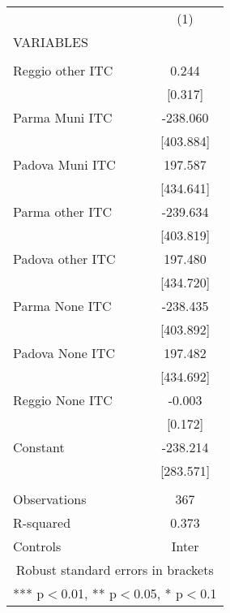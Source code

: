 \begin{tabular}{lc} \hline
 & (1) \\
VARIABLES &  \\ \hline
 &  \\
Reggio other ITC & 0.244 \\
 & [0.317] \\
Parma Muni ITC & -238.060 \\
 & [403.884] \\
Padova Muni ITC & 197.587 \\
 & [434.641] \\
Parma other ITC & -239.634 \\
 & [403.819] \\
Padova other ITC & 197.480 \\
 & [434.720] \\
Parma None ITC & -238.435 \\
 & [403.892] \\
Padova None ITC & 197.482 \\
 & [434.692] \\
Reggio None ITC & -0.003 \\
 & [0.172] \\
Constant & -238.214 \\
 & [283.571] \\
 &  \\
Observations & 367 \\
R-squared & 0.373 \\
 Controls & Inter \\ \hline
\multicolumn{2}{c}{ Robust standard errors in brackets} \\
\multicolumn{2}{c}{ *** p$<$0.01, ** p$<$0.05, * p$<$0.1} \\
\end{tabular}
